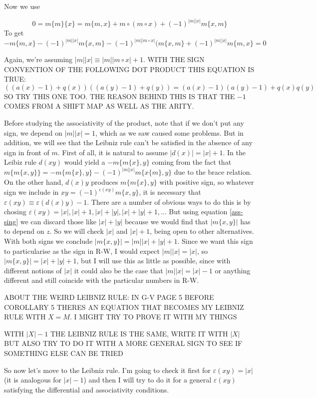 \documentclass[twoside]{article}
\begin{document}
 Now we use
 
 $$0=m\{m\}\{x\}=m\{m,x\}+m\circ(m\circ x)+(-1)^{|m||x|}m\{x,m\}$$
 To get
 \[
-m\{m,x\}-(-1)^{|m||x|}m\{x,m\}-(-1)^{|m||m\circ x|}(m\{x,m\}+(-1)^{|m||x|}m\{m,x\}=0
 \]
 
 Again, we're assuming  $|m||x|\equiv |m||m\circ x|+1$. WITH THE SIGN CONVENTION OF THE FOLLOWING DOT PRODUCT THIS EQUATION IS TRUE: $((a(x)-1)+q(x))((a(y)-1)+q(y))=(a(x)-1)(a(y)-1)+q(x)q(y)$ SO TRY THIS ONE TOO. THE REASON BEHIND THIS IS THAT THE $-1$ COMES FROM A SHIFT MAP AS WELL AS THE ARITY.
 
Before studying the associativity of the product, note that if we don't put any sign, we depend on $|m||x|=1$, which as we saw caused some problems. But in addition, we will see that the Leibniz rule can't be satisfied in the absence of any sign in front of $m$. First of all, it is natural to assume $|d(x)|=|x|+1$. In the Leibiz rule $d(xy)$ would yield a $-m\{m\{x\},y\}$ coming from the fact that $m\{m\{x,y\}\}=-m\{m\{x\},y\}-(-1)^{|m||x|}m\{x\{m\},y\}$ due to the brace relation. On the other hand, $d(x)y$ produces $m\{m\{x\},y\}$ with positive sign, so whatever sign we include in $xy=(-1)^{\varepsilon(xy)}m\{x,y\}$, it is necessary that $\varepsilon(xy)\equiv\varepsilon(d(x)y)-1$. There are a number of obvious ways to do this is by chosing $\varepsilon(xy)=|x|,|x|+1,|x|+|y|, |x|+|y|+1,\dots$ But using equation \ref{ass-sing} we can discard those like $|x|+|y|$ because we would find that $|m\{x,y\}|$ has to depend on $z$. So we will check $|x|$ and $|x|+1$, being open to other alternatives. With both signs we conclude $|m\{x,y\}|=|m||x|+|y|+1$. Since we want this sign to particularise as the sign in R-W, I would expect $|m||x|=|x|$, so $|m\{x,y\}|=|x|+|y|+1$, but I will use this as little as possible, since with different notions of $|x|$ it could also be the case that $|m||x|=|x|-1$ or anything different and still coincide with the particular numbers in R-W.

ABOUT THE WEIRD LEIBNIZ RULE: IN G-V PAGE 5 BEFORE COROLLARY 5 THERES AN EQUATION THAT BECOMES MY LEIBNIZ RULE WITH $X=M$. I MIGHT TRY TO PROVE IT WITH MY THINGS

WITH $|X|-1$ THE LEIBNIZ RULE IS THE SAME, WRITE IT WITH $|X|$ BUT ALSO TRY TO DO IT WITH A MORE GENERAL SIGN TO SEE IF SOMETHING ELSE CAN BE TRIED

So now let's move to the Leibniz rule. I'm going to check it first for $\varepsilon(xy)=|x|$ (it is analogous for $|x|-1$) and then I will try to do it for a general $\varepsilon(xy)$ satisfying the differential and associativity conditions.
\end{document}

